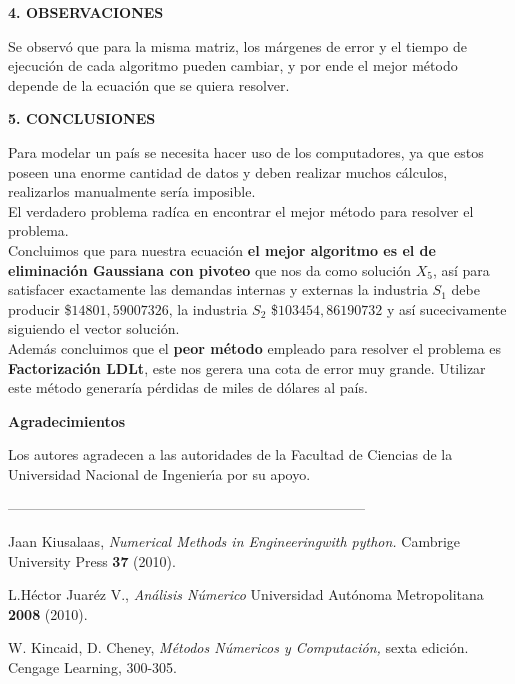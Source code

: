 \documentclass[10pt,a4paper]{article}
\begin{document}
\begin{multicols}{2}
\begin{center}
{\large \bf 4. OBSERVACIONES}
\end{center}
Se observó que para la misma matriz, los márgenes de error y el tiempo de ejecución de cada algoritmo pueden cambiar, y por ende el mejor método depende de la ecuación que se quiera resolver.\\
\begin{center}
{\large \bf 5. CONCLUSIONES}
\end{center}
Para modelar un país se necesita hacer uso de los computadores, ya que estos poseen una enorme cantidad de datos y deben realizar muchos cálculos, realizarlos manualmente sería imposible.\\
El verdadero problema radíca en encontrar el mejor método para resolver el problema.\\
Concluimos que para nuestra ecuación \textbf{el mejor algoritmo es el de eliminación Gaussiana con pivoteo} que nos da como solución $X_5$, así para satisfacer exactamente las demandas internas y externas la industria $S_1$ debe producir  \$$14801,59007326$, la  industria $S_2$ \$$103454,86190732$ y así sucecivamente siguiendo el vector solución.\\
Además concluimos que el \textbf{peor método} empleado para resolver el problema es \textbf{Factorización LDLt}, este nos gerera una cota de error muy grande. Utilizar este método generaría pérdidas de miles de dólares al país.

\begin{center}
{\large \bf Agradecimientos}
\end{center}
Los autores agradecen a las autoridades de la Facultad de Ciencias de la Universidad Nacional de 
Ingenier\'{\i}a por su apoyo.

\end{multicols}
\newpage

\begin{center}
 -----------------------------------------------------------------------------
\end{center}
\begin{multicols}{2}
\begin{list}{}{\setlength{\topsep}{0mm}\setlength{\itemsep}{0mm}%
\setlength{\parsep}{0mm}\setlength{\leftmargin}{4mm}}
%
\small
\item[1.] Jaan Kiusalaas, \textit{Numerical Methods in Engineering\linebreak with python.} Cambrige University Press \textbf{37} (2010).
\item[2.] L.Héctor Juaréz V., \textit{Análisis Númerico} Universidad Autónoma Metropolitana \textbf{2008} (2010).
\item[3.] W. Kincaid, D. Cheney, \textit{Métodos Númericos y Computación,} sexta edición. Cengage Learning, 300-305.
%
\end{list}
\end{multicols}
\end{document}
